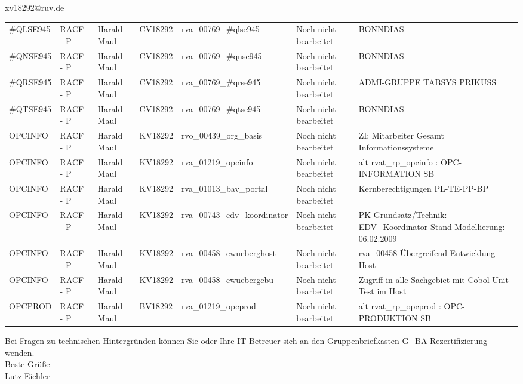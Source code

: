 \documentclass[a4paper,landscape,12pt]{letter}
\begin{document}
\begin{letter}{xv18292@ruv.de\hfill \break}
\begin{tiny}
\begin{longtable}{|p{35mm}|p{15mm}|p{25mm}|p{10mm}|p{40mm}|p{50mm}|p{50mm}|}
\#QLSE945 & RACF - P & Harald Maul & CV18292 & rva\_00769\_\#qlse945 & Noch nicht bearbeitet & BONNDIAS \\
\#QNSE945 & RACF - P & Harald Maul & CV18292 & rva\_00769\_\#qnse945 & Noch nicht bearbeitet & BONNDIAS \\
\#QRSE945 & RACF - P & Harald Maul & CV18292 & rva\_00769\_\#qrse945 & Noch nicht bearbeitet & ADMI-GRUPPE TABSYS PRIKUSS \\
\#QTSE945 & RACF - P & Harald Maul & CV18292 & rva\_00769\_\#qtse945 & Noch nicht bearbeitet & BONNDIAS \\
OPCINFO & RACF - P & Harald Maul & KV18292 & rvo\_00439\_org\_basis & Noch nicht bearbeitet & ZI: Mitarbeiter Gesamt Informationssysteme \\
OPCINFO & RACF - P & Harald Maul & KV18292 & rva\_01219\_opcinfo & Noch nicht bearbeitet & alt rvat\_rp\_opcinfo          : OPC- INFORMATION                         SB \\
OPCINFO & RACF - P & Harald Maul & KV18292 & rva\_01013\_bav\_portal & Noch nicht bearbeitet & Kernberechtigungen PL-TE-PP-BP \\
OPCINFO & RACF - P & Harald Maul & KV18292 & rva\_00743\_edv\_koordinator & Noch nicht bearbeitet & PK Grundsatz/Technik: EDV\_Koordinator Stand Modellierung: 06.02.2009 \\
OPCINFO & RACF - P & Harald Maul & KV18292 & rva\_00458\_ewueberghost & Noch nicht bearbeitet & rva\_00458 Übergreifend Entwicklung Host \\
OPCINFO & RACF - P & Harald Maul & KV18292 & rva\_00458\_ewuebergcbu & Noch nicht bearbeitet & Zugriff in alle Sachgebiet mit Cobol Unit Test im Host \\
OPCPROD & RACF - P & Harald Maul & BV18292 & rva\_01219\_opcprod & Noch nicht bearbeitet & alt rvat\_rp\_opcprod          : OPC-PRODUKTION                           SB \\

\hline
		\end{longtable}
		\end{tiny}
	
\begin{minipage}{\textwidth}
			Bei Fragen zu technischen Hintergründen können Sie 
			oder Ihre IT-Betreuer sich an den Gruppenbriefkasten 
			G\_BA-Rezertifizierung
			wenden.\\
			\linebreak
			Beste Grüße\\
			Lutz Eichler
	\end{minipage}
	\end{letter}
	
\end{document}

